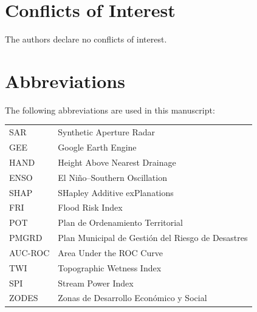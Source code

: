 \documentclass{article}
\begin{document}
\section*{Conflicts of Interest}

The authors declare no conflicts of interest.

\section*{Abbreviations}

The following abbreviations are used in this manuscript:\\

\noindent
\begin{tabular}{@{}ll}
SAR & Synthetic Aperture Radar\\
GEE & Google Earth Engine\\
HAND & Height Above Nearest Drainage\\
ENSO & El Ni\~no--Southern Oscillation\\
SHAP & SHapley Additive exPlanations\\
FRI & Flood Risk Index\\
POT & Plan de Ordenamiento Territorial\\
PMGRD & Plan Municipal de Gesti\'on del Riesgo de Desastres\\
AUC-ROC & Area Under the ROC Curve\\
TWI & Topographic Wetness Index\\
SPI & Stream Power Index\\
ZODES & Zonas de Desarrollo Econ\'omico y Social
\end{tabular}




\end{document}
